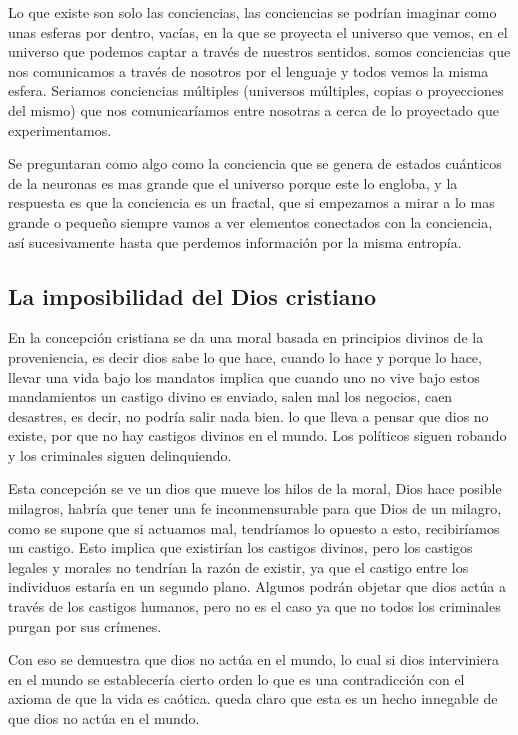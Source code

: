 \documentclass[12pt,letterpaper, a4paper ]{article}
\begin{document}
Lo que existe son solo las conciencias, las conciencias se podrían imaginar como unas esferas por dentro, vacías, en la que se proyecta el universo que vemos, en el universo que podemos captar a través de nuestros sentidos. somos conciencias que nos comunicamos a través de nosotros por el lenguaje y todos vemos la misma esfera. Seriamos conciencias múltiples (universos múltiples, copias o proyecciones del mismo) que nos comunicaríamos entre nosotras a cerca de lo proyectado que experimentamos.

Se preguntaran como algo como la conciencia que se genera de estados cuánticos de la neuronas es mas grande que el universo porque este lo engloba, y la respuesta es que la conciencia es un fractal, que si empezamos a mirar a lo mas grande o pequeño siempre vamos a ver elementos conectados con la conciencia, así sucesivamente hasta que perdemos información por la misma entropía.

\subsection{La imposibilidad del Dios cristiano}

En la concepción cristiana se da una moral basada en principios divinos de la proveniencia, es decir dios sabe lo que hace, cuando lo hace y porque lo hace, llevar una vida bajo los mandatos implica que cuando uno no vive bajo estos mandamientos un castigo divino es enviado, salen mal los negocios, caen desastres, es decir, no podría salir nada bien. lo que lleva a pensar que dios no existe, por que no hay castigos divinos en el mundo. Los políticos siguen robando y los criminales siguen delinquiendo.

Esta concepción se ve un dios que mueve los hilos de la moral, Dios hace posible milagros, habría que tener una fe inconmensurable para que Dios de un milagro, como se supone que si actuamos mal, tendríamos lo opuesto a esto, recibiríamos un castigo. Esto implica que existirían los castigos divinos, pero los castigos legales y morales no tendrían la razón de existir, ya que el castigo entre los individuos estaría en un segundo plano. Algunos podrán objetar que dios actúa a través de los castigos humanos, pero no es el caso ya que no todos los criminales purgan por sus crímenes.

Con eso se demuestra que dios no actúa en el mundo, lo cual si dios interviniera en el mundo se establecería cierto orden lo que es una contradicción con el axioma de que la vida es caótica. queda claro que esta es un hecho innegable de que dios no actúa en el mundo.
\end{document}
